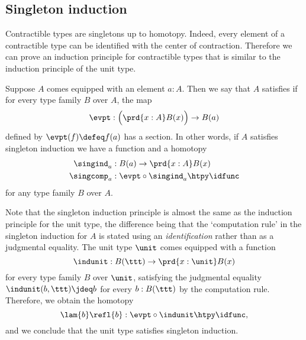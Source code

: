 \subsection{Singleton induction}

Contractible types are singletons up to homotopy. Indeed, every element of a contractible type can be identified with the center of contraction. Therefore we can prove an induction principle for contractible types that is similar to the induction principle of the unit type.

\begin{defn}\label{defn:singleton-induction}
  Suppose $A$ comes equipped with an element $a:A$. Then we say that $A$ satisfies  if for every type family $B$ over $A$, the map
  \begin{equation*}
    \evpt:\Big(\prd{x:A}B(x)\Big)\to B(a)
  \end{equation*}
  defined by $\evpt(f)\defeq f(a)$ has a section. In other words, if $A$ satisfies singleton induction we have a function and a homotopy
  \begin{align*}
    \singind_{a} & : B(a)\to \prd{x:A}B(x) \\
    \singcomp_{a} & : \evpt\circ \singind_{a} \htpy \idfunc
  \end{align*}
  for any type family $B$ over $A$.
\end{defn}

\begin{eg}
  Note that the singleton induction principle is almost the same as the induction principle for the unit type, the difference being that the `computation rule' in the singleton induction for $A$ is stated using an \emph{identification} rather than as a judgmental equality. The unit type $\unit$ comes equipped with a function
  \begin{equation*}
    \indunit:B(\ttt)\to \prd{x:\unit}B(x)
  \end{equation*}
  for every type family $B$ over $\unit$, satisfying the judgmental equality $\indunit(b,\ttt)\jdeq b$ for every $b:B(\ttt)$ by the computation rule. Therefore, we obtain the homotopy
  \begin{equation*}
    \lam{b}\refl{b}:\evpt\circ\indunit \htpy\idfunc,
  \end{equation*}
  and we conclude that the unit type satisfies singleton induction. 
\end{eg}

